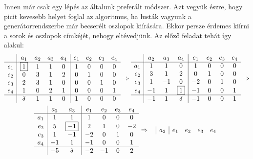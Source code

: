 \documentclass[a4paper, showtrims]{memoir}
\theoremstyle{plain}
\theoremstyle{remark}
\theoremstyle{definition}
\begin{document}
Innen már csak egy lépés az általunk preferált módszer.
Azt vegyük észre, hogy picit kevesebb helyet foglal az algoritmus, 
ha lusták vagyunk a generátorrendszerbe már becserélt oszlopok kiírására.
Ekkor persze érdemes kiírni a sorok és oszlopok címkéjét, nehogy eltévedjünk.
Az előző feladat tehát így alakul:
\begin{multline*}
	\begin{array}{r|cccc|cccc}
		    & a_1       & a_2 & a_3 & a_4 & e_1 & e_2 & e_3 & e_4 \\
		\hline
		e_1 & \boxed{1} & 1   & 1   & 0   & 1   & 0   & 0   & 0   \\
		e_2 & 0         & 3   & 1   & 2   & 0   & 1   & 0   & 0   \\
		e_3 & 2         & 3   & 1   & 0   & 0   & 0   & 1   & 0   \\
		e_4 & 1         & 0   & 2   & 1   & 0   & 0   & 0   & 1   \\
		\hline
		    & \delta    & 1   & 1   & 0   & 1   & 0   & 0   & 0
	\end{array}\Rightarrow
	\begin{array}{r|ccc|cccc}
		    & a_2 & a_3 & a_4       & e_1 & e_2 & e_3 & e_4 \\
		\hline
		a_1 & 1   & 1   & 0         & 1   & 0   & 0   & 0   \\
		e_2 & 3   & 1   & 2         & 0   & 1   & 0   & 0   \\
		e_3 & 1   & -1  & 0         & -2  & 0   & 1   & 0   \\
		e_4 & -1  & 1   & \boxed{1} & -1  & 0   & 0   & 1   \\
		\hline
		    & -1  & 1   & \delta    & -1  & 0   & 0   & 1
	\end{array}\Rightarrow
	\\
	\begin{array}{r|cc|cccc}
		    & a_2 & a_3        & e_1 & e_2 & e_3 & e_4 \\
		\hline
		a_1 & 1   & 1          & 1   & 0   & 0   & 0   \\
		e_2 & 5   & \boxed{-1} & 2   & 1   & 0   & -2  \\
		e_3 & 1   & -1         & -2  & 0   & 1   & 0   \\
		a_4 & -1  & 1          & -1  & 0   & 0   & 1   \\
		\hline
		    & -5  & \delta     & -2  & -1  & 0   & 2
	\end{array}\Rightarrow
	\begin{array}{r|c|cccc}
		    & a_2        & e_1 & e_2         & e_3          & e_4          \\

\end{array}
\end{multline*}
\end{document}
